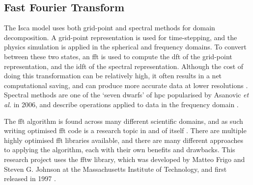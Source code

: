\documentclass[a4paper,11pt]{report}
\begin{document}
\subsection{Fast Fourier Transform}
The Isca model uses both grid-point and spectral methods for domain decomposition. A grid-point representation is used for time-stepping, and the physics simulation is applied in the spherical and frequency domains. To convert between these two states, an \gls{fft} is used to compute the \gls{dft} of the grid-point representation, and the \gls{idft} of the spectral representation. Although the cost of doing this transformation can be relatively high, it often results in a net computational saving, and can produce more accurate data at lower resolutions \cite{bader2008climate}. Spectral methods are one of the `seven dwarfs' of \gls{hpc} popularised by Asanovic \textit{et al.} in 2006, and describe operations applied to data in the frequency domain \cite{asanovic2006landscape} .
\par
The \gls{fft} algorithm is found across many different scientific domains, and as such writing optimised \gls{fft} code is a research topic in and of itself \cite{singleton1967method, cooley1965algorithm, sorensen1987real}. There are multiple highly optimised \gls{fft} libraries available, and there are many different approaches to applying the algorithm, each with their own benefits and drawbacks. This research project uses the \gls{fftw} library, which was developed by Matteo Frigo and Steven G. Johnson at the Massachusetts Institute of Technology, and first released in 1997 \cite{frigo1998fftw}. 
\end{document}

